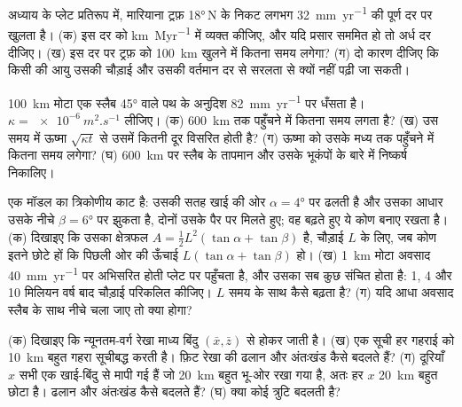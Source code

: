 \begin{exercise}[$\star\star$]\label{exo:b1:active-margins:9}
अध्याय के प्लेट प्रतिरूप में, मारियाना ट्रफ़ \ang{18}\,N के निकट लगभग \qty{32}{mm.yr^{-1}} की पूर्ण दर पर खुलता है। (क) इस दर को \unit{km.Myr^{-1}} में व्यक्त कीजिए, और यदि प्रसार सममित हो तो अर्ध दर दीजिए। (ख) इस दर पर ट्रफ़ को \qty{100}{km} खुलने में कितना समय लगेगा? (ग) दो कारण दीजिए कि किसी  की आयु उसकी चौड़ाई और उसकी वर्तमान दर से सरलता से क्यों नहीं पढ़ी जा सकती।
\end{exercise}

\begin{exercise}[$\star\star\star$]\label{exo:b1:active-margins:10}
\qty{100}{km} मोटा एक स्लैब \ang{45}  वाले पथ के अनुदिश \qty{82}{mm.yr^{-1}} पर धँसता है। $\kappa = \qty{e-6}{m^2.s^{-1}}$ लीजिए। (क) \qty{600}{km} तक पहुँचने में कितना समय लगता है? (ख) उस समय में ऊष्मा $\sqrt{\kappa t}$ से उसमें कितनी दूर विसरित होती है? (ग) ऊष्मा को उसके मध्य तक पहुँचने में कितना समय लगेगा? (घ) \qty{600}{km} पर स्लैब के तापमान और उसके भूकंपों के बारे में निष्कर्ष निकालिए।
\end{exercise}

\begin{exercise}[$\star\star\star$]\label{exo:b1:active-margins:11}
एक मॉडल  का त्रिकोणीय काट है: उसकी सतह खाई की ओर $\alpha = \ang{4}$ पर ढलती है और उसका आधार उसके नीचे $\beta = \ang{6}$ पर झुकता है, दोनों उसके पैर पर मिलते हुए; वह बढ़ते हुए ये कोण बनाए रखता है। (क) दिखाइए कि उसका क्षेत्रफल $A = \frac12 L^2(\tan\alpha + \tan\beta)$ है, चौड़ाई $L$ के लिए, जब कोण इतने छोटे हों कि पिछली ओर की ऊँचाई $L(\tan\alpha + \tan\beta)$ हो। (ख) \qty{1}{km} मोटा अवसाद \qty{40}{mm.yr^{-1}} पर अभिसरित होती प्लेट पर पहुँचता है, और उसका सब कुछ संचित होता है: 1, 4 और 10 मिलियन वर्ष बाद चौड़ाई परिकलित कीजिए। $L$ समय के साथ कैसे बढ़ता है? (ग) यदि आधा अवसाद स्लैब के साथ नीचे चला जाए तो क्या होगा?
\end{exercise}

\begin{exercise}[$\star\star\star$]\label{exo:b1:active-margins:12}
(क) दिखाइए कि न्यूनतम-वर्ग रेखा माध्य बिंदु $(\bar x, \bar z)$ से होकर जाती है। (ख) एक सूची हर गहराई को \qty{10}{km} बहुत गहरा सूचीबद्ध करती है। फ़िट रेखा की ढलान और अंतःखंड कैसे बदलते हैं? (ग) दूरियाँ $x$ सभी एक खाई-बिंदु से मापी गई हैं जो \qty{20}{km} बहुत भू-ओर रखा गया है, अतः हर $x$ \qty{20}{km} बहुत छोटा है। ढलान और अंतःखंड कैसे बदलते हैं? (घ) क्या कोई त्रुटि  बदलती है?
\end{exercise}

